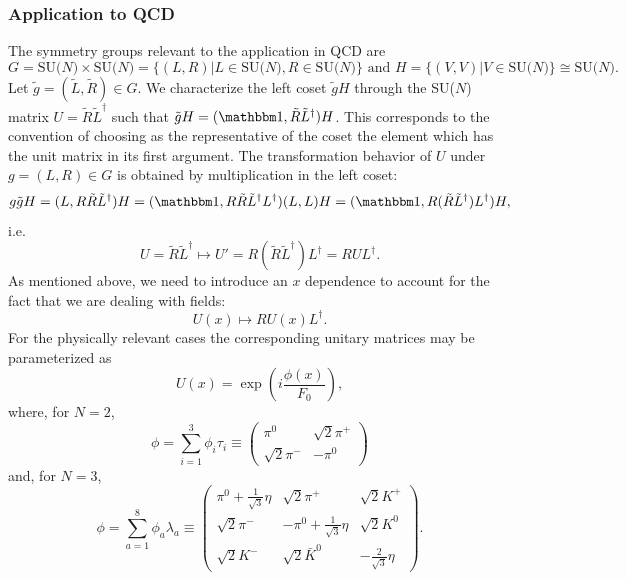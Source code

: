 \documentclass[twoside,12pt]{article}
\begin{document}
\subsubsection{Application to QCD}
\label{subsec_aqcd}

   The symmetry groups relevant to the application in QCD are
\begin{displaymath}
G=\mbox{SU($N$)}\times\mbox{SU($N$)}=\{(L,R)|
L\in \mbox{SU($N$)}, R\in
\mbox{SU($N$)}\}\,\,\mbox{and}\,\, H=\{(V,V)|V\in \mbox{SU($N$)}\}
\cong\mbox{SU($N$)}.
\end{displaymath}
Let $\tilde{g}=(\tilde{L},\tilde{R})\in G$.
   We characterize the left coset $\tilde{g}H$
through the SU($N$) matrix $U=\tilde{R}\tilde{L}^\dagger$
\cite{Balachandran:zj:2:2} such that $\tilde{g}H=({\mathbbm 1},\tilde{R}\tilde{L}^\dagger)H$.
   This corresponds to the convention of choosing as the representative of the
coset the element which has the unit matrix in its first argument.
   The transformation behavior of $U$ under $g=(L,R)\in G$ is obtained by
multiplication in the left coset:
$$g \tilde{g}H=(L, R\tilde{R}\tilde{L}^\dagger)H=
({\mathbbm 1},R\tilde{R}\tilde{L}^\dagger L^\dagger)(L,L)H=
({\mathbbm 1},R(\tilde{R}
\tilde{L}^\dagger)L^\dagger)H,$$
i.e.\
\begin{equation}
\label{3:1:2:utrafo}
U=\tilde{R}\tilde{L}^\dagger \mapsto U'=R(\tilde{R}\tilde{L}^\dagger)L^\dagger
=RUL^\dagger.
\end{equation}
   As mentioned above, we need to introduce an $x$ dependence to account for
   the fact that we are dealing with fields:
\begin{equation}
\label{3:1:2:utrfafo}
U(x)\mapsto R U(x) L^\dagger.
\end{equation}
   For the physically relevant cases
the corresponding unitary matrices may be parameterized as
\begin{equation}
\label{3:1:2:upar}
U(x)=\exp\left(i\frac{\phi(x)}{F_0}\right),
\end{equation}
where, for $N=2$,
\begin{equation}
\label{3:1:2:phisu2}
\phi=\sum_{i=1}^3\phi_i\tau_i
\equiv
\left(\begin{array}{cc}
\pi^0&\sqrt{2}\pi^+\\
\sqrt{2}\pi^-&-\pi^0
\end{array}\right)
\end{equation}
and, for $N=3$,
\begin{equation}
\label{3:1:2:phisu3}
\phi=\sum_{a=1}^8  \phi_a\lambda_a \equiv
\left(\begin{array}{ccc}
\pi^0+\frac{1}{\sqrt{3}}\eta &\sqrt{2}\pi^+&\sqrt{2}K^+\\
\sqrt{2}\pi^-&-\pi^0+\frac{1}{\sqrt{3}}\eta&\sqrt{2}K^0\\
\sqrt{2}K^- &\sqrt{2}\bar{K}^0&-\frac{2}{\sqrt{3}}\eta
\end{array}\right).
\end{equation}
\end{document}
